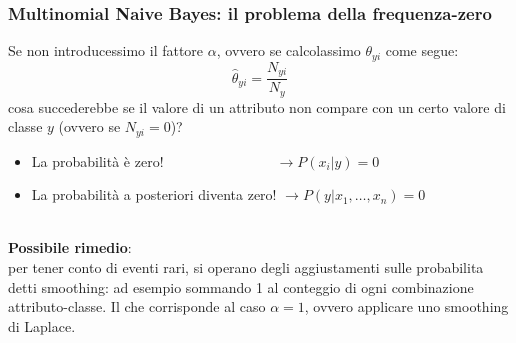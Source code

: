 \begin{frame}
	
	\frametitle{Multinomial Naive Bayes: il problema della frequenza-zero}	
	
	Se non introducessimo il fattore $\alpha$, ovvero se calcolassimo $\theta_{yi}$ come segue:
	$$\hat{\theta}_{yi} = \frac{N_{yi}}{N_y}$$
	cosa succederebbe se il valore di un attributo non compare con un certo valore di classe $y$ (ovvero se $N_{yi} = 0$)?
	\pause
	\begin{itemize}
		\item La probabilità è zero! $\qquad \qquad \qquad \quad \text{ } \rightarrow P(x_i \vert y) = 0$
		\item La probabilità a posteriori diventa zero! $\rightarrow P(y \vert x_1, \dots, x_n) = 0$
	\end{itemize}
	\pause
	\ \\
	\textbf{Possibile rimedio}:\\
		per tener conto di eventi rari, si operano degli aggiustamenti sulle probabilita detti smoothing: ad esempio sommando 1 al conteggio di ogni combinazione attributo-classe. Il che corrisponde al caso $\alpha = 1$, ovvero applicare uno smoothing di Laplace.

\end{frame}


